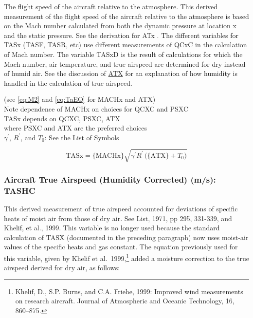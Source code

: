 \documentclass[
  english,
]{book}
\begin{document}
The flight speed of the aircraft relative to the atmosphere. This derived measurement of the flight speed of the aircraft relative to the atmosphere is based on the Mach number calculated from both the dynamic pressure at location x and the static pressure. See the derivation for ATx . The different variables for TASx (TASF, TASR, etc) use different measurements of QCxC in the calculation of Mach number. The variable TASxD is the result of calculations for which the Mach number, air temperature, and true airspeed are determined for dry instead of humid air. See the discussion of \protect\hyperlink{ATX}{ATX} for an explanation of how humidity is handled in the calculation of true airspeed.

(see \eqref{eq:M2} and \eqref{eq:TaEQ} for MACHx and ATX)\\
Note dependence of MACHx on choices for QCXC and PSXC\\
TASx depends on QCXC, PSXC, ATX\\
\hspace*{0.333em}\hspace*{0.333em}\hspace*{0.333em}\hspace*{0.333em}\hspace*{0.333em}where PSXC and ATX are the preferred choices\\
\(\gamma^{\prime}\), \(R^{\prime}\), and \(T_{0}\): See the List of Symbols

\begin{equation}
\mathrm{TASx}=\mathrm{\{MACHx\}}\sqrt{\gamma^{\prime}R^{\prime}\mathrm{\,(\{ATX\}}+T_{0})}
\label{eq:TASx}
\end{equation}

\hypertarget{tashc}{%
\subsubsection*{Aircraft True Airspeed (Humidity Corrected) (m/s): TASHC}\label{tashc}}

This derived measurement of true airspeed accounted for deviations of specific heats of moist air from those of dry air. See List, 1971, pp 295, 331-339, and Khelif, et al., 1999. This variable is no longer used because the standard
calculation of TASX (documented in the preceding paragraph) now uses moist-air
values of the specific heats and gas constant. The equation previously used for this variable, given by Khelif et al.~1999,\footnote{Khelif, D., S.P. Burns, and C.A. Friehe, 1999: Improved wind measurements on research aircraft. Journal of Atmospheric and Oceanic Technology, 16, 860--875.}
added a moisture correction to the true airspeed derived for dry air, as follows:
\end{document}
